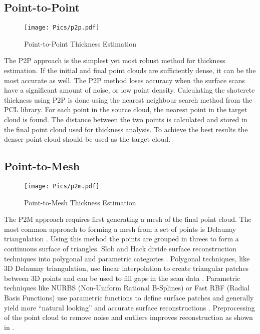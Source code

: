 \subsection{Point-to-Point}
\begin{figure}[h!]
    \centering
    \texttt{[image: Pics/p2p.pdf]}
    \caption{Point-to-Point Thickness Estimation}
    \label{fig:p2pdia}
\end{figure}
The P2P approach is the simplest yet most robust method for thickness estimation. If the initial and final point clouds are sufficiently dense, it can be the most accurate as well. The P2P method loses accuracy when the surface scans have a significant amount of noise, or low point density. Calculating the shotcrete thickness using P2P is done using the nearest neighbour search method from the PCL library. For each point in the source cloud, the nearest point in the target cloud is found. The distance between the two points is calculated and stored in the final point cloud used for thickness analysis. To achieve the best results the denser point cloud should be used as the target cloud.\\
\subsection{Point-to-Mesh}
\begin{figure}[h!]
    \centering
    \texttt{[image: Pics/p2m.pdf]}
    \caption{Point-to-Mesh Thickness Estimation}
    \label{fig:p2mdia}
\end{figure}

The P2M approach requires first generating a mesh of the final point cloud. The most common approach to forming a mesh from a set of points is Delaunay triangulation \cite{delaunay}. Using this method the points are grouped in threes to form a continuous surface of triangles. Slob and Hack divide surface reconstruction techniques into polygonal and parametric categories \cite{mesh1}. Polygonal techniques, like 3D Delaunay triangulation, use linear interpolation to create triangular patches between 3D points and can be used to fill gaps in the scan data \cite{mesh3}. Parametric techniques like NURBS (Non-Uniform Rational B-Splines) or Fast RBF (Radial Basis Functions) use parametric functions to define surface patches and generally yield more ``natural looking'' and accurate surface reconstructions \cite{mesh1}. Preprocessing of the point cloud to remove noise and outliers improves reconstruction as shown in \cite{mesh2}.\\

